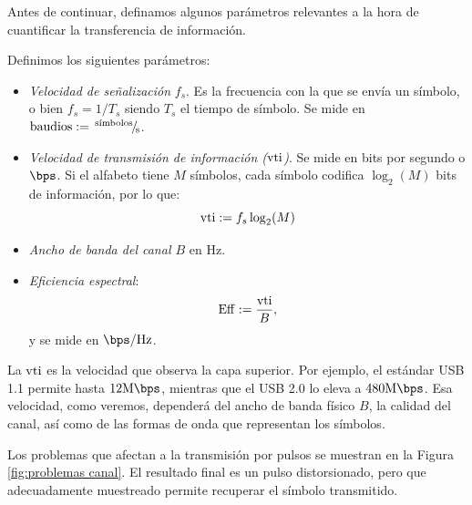 Antes de continuar, definamos algunos parámetros relevantes a la hora de cuantificar la transferencia de información.

\begin{definicion}
    Definimos los siguientes parámetros:
    \begin{itemize}
        \item \emph{Velocidad de señalización} $f_s$. Es la frecuencia con la que se envía un símbolo, o bien $f_s=1/T_s$ siendo $T_s$ el tiempo de símbolo. Se mide en $\unit{baudios}:=\rfrac{\text{símbolos}}{\unit{\second}}$.

    \item \emph{Velocidad de transmisión de información ($\mathrm{vti}$)}. Se mide en bits por segundo o $\unit{\bps}$. Si el alfabeto tiene $M$ símbolos, cada símbolo codifica $\log_2(M)$ bits de información, por lo que:
    \begin{equation*}
        \mathrm{vti} := f_s \log_2(M)
    \end{equation*}
    \item \emph{Ancho de banda del canal $B$} en $\unit{\hertz}$.
    \item \emph{Eficiencia espectral}:
     \begin{equation*}
        \mathrm{Eff} := \frac{\mathrm{vti}}{B},
     \end{equation*}
     y se mide en $\unit{\bps/\hertz}$.
    \end{itemize}
\end{definicion}
La $\mathrm{vti}$ es la velocidad que observa la capa superior. Por ejemplo, el estándar USB 1.1 permite hasta $12\unit{\mega\bps}$, mientras que el USB 2.0 lo eleva a $480 \unit{\mega\bps}$. Esa velocidad, como veremos, dependerá del ancho de banda físico $B$, la calidad del canal, así como de las formas de onda que representan los símbolos.

Los problemas que afectan a la transmisión por pulsos se muestran en la Figura \ref{fig:problemas canal}. El resultado final es un pulso distorsionado, pero que adecuadamente muestreado permite recuperar el símbolo transmitido.

